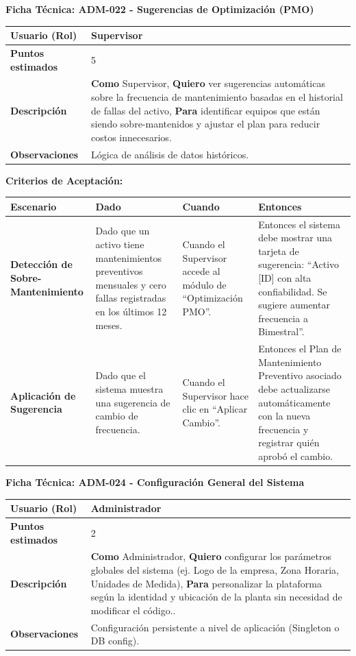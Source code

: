 \noindent
\textbf{Ficha Técnica: ADM-022 - Sugerencias de Optimización (PMO)}
\footnotesize
\begin{longtable}{|p{}|p{}|}
\hline
\textbf{Usuario (Rol)} & Supervisor \\ \hline
\textbf{Puntos estimados} & 5 \\ \hline
\textbf{Descripción} & \textbf{Como} Supervisor, \textbf{Quiero} ver sugerencias automáticas sobre la frecuencia de mantenimiento basadas en el historial de fallas del activo, \textbf{Para} identificar equipos que están siendo sobre-mantenidos y ajustar el plan para reducir costos innecesarios. \\ \hline
\textbf{Observaciones} & Lógica de análisis de datos históricos. \\ \hline
\end{longtable}
\normalsize

\noindent
\textbf{Criterios de Aceptación:}
\footnotesize
\begin{longtable}{|p{}|p{}|p{}|p{}|}
\hline
\textbf{Escenario} & \textbf{Dado} & \textbf{Cuando} & \textbf{Entonces} \\ \hline
\endhead
\textbf{Detección de Sobre-Mantenimiento} & Dado que un activo tiene mantenimientos preventivos mensuales y cero fallas registradas en los últimos 12 meses. & Cuando el Supervisor accede al módulo de ``Optimización PMO''. & Entonces el sistema debe mostrar una tarjeta de sugerencia: ``Activo [ID] con alta confiabilidad. Se sugiere aumentar frecuencia a Bimestral''. \\ \hline
\textbf{Aplicación de Sugerencia} & Dado que el sistema muestra una sugerencia de cambio de frecuencia. & Cuando el Supervisor hace clic en ``Aplicar Cambio''. & Entonces el Plan de Mantenimiento Preventivo asociado debe actualizarse automáticamente con la nueva frecuencia y registrar quién aprobó el cambio. \\ \hline
\end{longtable}
\normalsize

\noindent
\textbf{Ficha Técnica: ADM-024 - Configuración General del Sistema}
\footnotesize
\begin{longtable}{|p{}|p{}|}
\hline
\textbf{Usuario (Rol)} & Administrador \\ \hline
\textbf{Puntos estimados} & 2 \\ \hline
\textbf{Descripción} & \textbf{Como} Administrador, \textbf{Quiero} configurar los parámetros globales del sistema (ej. Logo de la empresa, Zona Horaria, Unidades de Medida), \textbf{Para} personalizar la plataforma según la identidad y ubicación de la planta sin necesidad de modificar el código.. \\ \hline
\textbf{Observaciones} & Configuración persistente a nivel de aplicación (Singleton o DB config). \\ \hline
\end{longtable}
\normalsize

